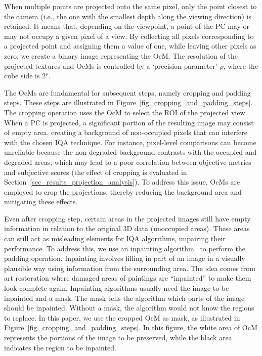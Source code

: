 \documentclass[final,3p,times,twocolumn]{elsarticle}
\begin{document}
When multiple points are projected onto the same pixel, only the point closest to the camera (i.e., the one with the smallest depth along the viewing direction) is retained. It means that, depending on the viewpoint, a point of the \gls{PC} may or may not occupy a given pixel of a view. By collecting all pixels corresponding to a projected point and assigning them a value of one, while leaving other pixels as zero, we create a binary image representing the \gls{OcM}. The resolution of the projected textures and \glspl{OcM} is controlled by a `precision parameter' $\rho$, where the cube side is $2^\rho$.

The \glspl{OcM} are fundamental for subsequent steps, namely cropping and padding steps. These steps are illustrated in Figure~\ref{fig_cropping_and_padding_steps}. The cropping operation uses the \gls{OcM} to select the \gls{ROI} of the projected view. When a \gls{PC} is projected, a significant portion of the resulting image may consist of empty area, creating a background of non-occupied pixels that can interfere with the chosen \gls{IQA} technique. For instance, pixel-level comparisons can become unreliable because the non-degraded background contrasts with the occupied and degraded areas, which may lead to a poor correlation between objective metrics and subjective scores (the effect of cropping is evaluated in Section~\ref{sec_results_projection_analysis}). To address this issue, \glspl{OcM} are employed to crop the projections, thereby reducing the background area and mitigating these effects.







Even after cropping step, certain areas in the projected images still have empty information in relation to the original \gls{3D} data (unoccupied areas). These areas can still act as misleading elements for \gls{IQA} algorithms, impairing their performance. To address this, we use an inpainting algorithm~\cite{telea2004image,bertalmio2001navier} to perform the padding operation. Inpainting involves filling in part of an image in a visually plausible way using information from the surrounding area. The idea comes from art restoration where damaged areas of paintings are ``inpainted'' to make them look complete again. Inpainting algorithms usually need the image to be inpainted and a mask. The mask tells the algorithm which parts of the image should be inpainted. Without a mask, the algorithm would not know the regions to replace. In this paper, we use the cropped \gls{OcM} as mask, as illustrated in Figure~\ref{fig_cropping_and_padding_steps}. In this figure, the white area of \gls{OcM} represents the portions of the image to be preserved, while the black area indicates the region to be inpainted.
\end{document}
